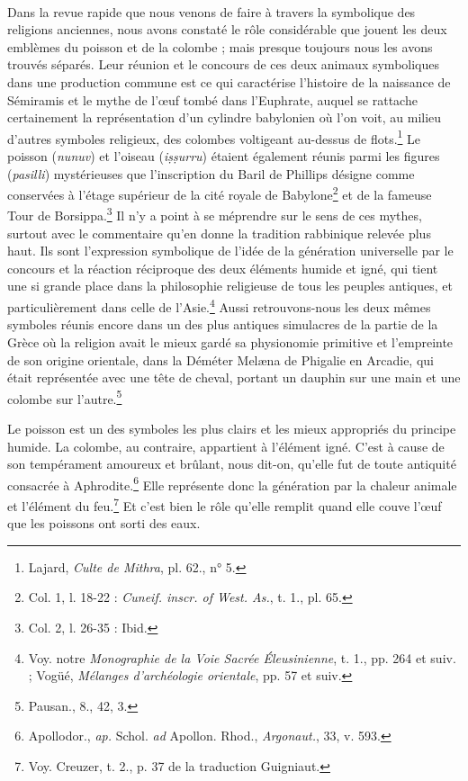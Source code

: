 \documentclass[a4paper, 11pt, oneside, landscape]{article}
\begin{document}
\paragraph{}
Dans la revue rapide que nous venons de faire à travers la symbolique des religions anciennes, nous avons constaté le rôle considérable que jouent les deux emblèmes du poisson et de la colombe ; mais presque toujours nous les avons trouvés séparés. Leur réunion et le concours de ces deux animaux symboliques dans une production commune est ce qui caractérise l'histoire de la naissance de Sémiramis et le mythe de l'œuf tombé dans l'Euphrate, auquel se rattache certainement la représentation d'un cylindre babylonien où l'on voit, au milieu d'autres symboles religieux, des colombes voltigeant au-dessus de flots.\footnote{Lajard, \emph{Culte de Mithra}, pl. 62., n° 5.} Le poisson (\emph{nunuv}) et l'oiseau (\emph{iṣṣurru}) étaient également réunis parmi les figures (\emph{pasilli}) mystérieuses que l'inscription du Baril de Phillips désigne comme conservées à l'étage supérieur de la cité royale de Babylone\footnote{Col. 1, l. 18-22 : \emph{Cuneif. inscr. of West. As.}, t. 1., pl. 65.} et de la fameuse Tour de Borsippa.\footnote{Col. 2, l. 26-35 : Ibid.} Il n'y a point à se méprendre sur le sens de ces mythes, surtout avec le commentaire qu'en donne la tradition rabbinique relevée plus haut. Ils sont l'expression symbolique de l'idée de la génération universelle par le concours et la réaction réciproque des deux éléments humide et igné, qui tient une si grande place dans la philosophie religieuse de tous les peuples antiques, et particulièrement dans celle de l'Asie.\footnote{Voy. notre \emph{Monographie de la Voie Sacrée Éleusinienne}, t. 1., pp. 264 et suiv. ; Vogüé, \emph{Mélanges d'archéologie orientale}, pp. 57 et suiv.} Aussi retrouvons-nous les deux mêmes symboles réunis encore dans un des plus antiques simulacres de la partie de la Grèce où la religion avait le mieux gardé sa physionomie primitive et l'empreinte de son origine orientale, dans la Déméter Melæna de Phigalie en Arcadie, qui était représentée avec une tête de cheval, portant un dauphin sur une main et une colombe sur l'autre.\footnote{Pausan., 8., 42, 3.}

Le poisson est un des symboles les plus clairs et les mieux appropriés du principe humide. La colombe, au contraire, appartient à l'élément igné. C'est à cause de son tempérament amoureux et brûlant, nous dit-on, qu'elle fut de toute antiquité consacrée à Aphrodite.\footnote{Apollodor., \emph{ap.} Schol. \emph{ad} Apollon. Rhod., \emph{Argonaut.}, 33, v. 593.} Elle représente donc la génération par la chaleur animale et l'élément du feu.\footnote{Voy. Creuzer, t. 2., p. 37 de la traduction Guigniaut.} Et c'est bien le rôle qu'elle remplit quand elle couve l'œuf que les poissons ont sorti des eaux.
\end{document}
